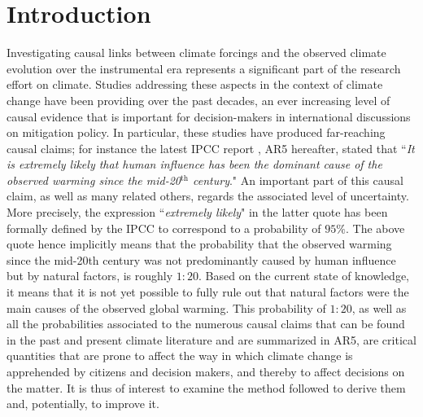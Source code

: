 \documentclass[12pt]{article}
\begin{document}
\section{Introduction}
Investigating causal links between climate forcings and the observed climate evolution over the instrumental era represents a significant part of the research effort on climate. Studies addressing these aspects in the context of climate change have been providing over the past decades, an ever increasing level of causal evidence that is important for decision-makers in international discussions on mitigation policy. In particular, these studies have produced far-reaching causal claims; for instance the latest IPCC report \citep{AR5}, AR5 hereafter, stated that ``\textit{It is extremely likely that human influence has been the dominant cause of the observed warming since the mid-20$^{\textrm{th}}$ century}." An important part of this causal claim, as well as many related others, regards the associated level of uncertainty. More precisely, the expression ``\textit{extremely likely}" in the latter quote has been formally defined by the IPCC \citep{Mas10} to correspond to a probability of $95\%$. The above quote hence implicitly means that the probability that the observed warming since the mid-20th century was not predominantly caused by human influence but by natural factors, is roughly $1:20$. Based on the current state of knowledge, it means that it is not yet possible to fully rule out that natural factors were the main causes of the observed global warming. %
This probability of $1:20$, as well as all the probabilities associated to the numerous causal claims that can be found in the past and present climate literature and are summarized in AR5, are critical quantities that are prone to affect the way in which climate change is apprehended by citizens and decision makers, and thereby to affect decisions on the matter. It is thus of interest to examine the method followed to derive them and, potentially, to improve it.
\end{document}
